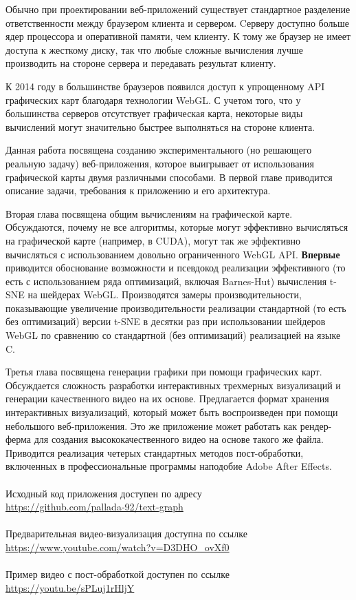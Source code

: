 Обычно при проектировании веб-приложений существует стандартное разделение ответственности между браузером клиента и сервером. Cерверу доступно больше ядер процессора и оперативной памяти, чем клиенту. К тому же браузер не имеет доступа к жесткому диску, так что любые сложные вычисления лучше производить на стороне сервера и передавать результат клиенту.

К 2014 году в большинстве браузеров появился доступ к упрощенному API графических карт благодаря технологии WebGL. С учетом того, что у большинства серверов отсутствует графическая карта, некоторые виды вычислений могут значительно быстрее выполняться на стороне клиента.

Данная работа посвящена созданию экспериментального (но решающего реальную задачу) веб-приложения, которое выигрывает от использования графической карты двумя различными способами. В первой главе приводится описание задачи, требования к приложению и его архитектура.

Вторая глава посвящена общим вычислениям на графической карте. Обсуждаются, почему не все алгоритмы, которые могут эффективно вычисляться на графической карте (например, в CUDA), могут так же эффективно вычисляться с использованием довольно ограниченного WebGL API. {\bfseries Впервые} приводится обоснование возможности и псевдокод реализации эффективного (то есть с использованием ряда оптимизаций, включая Barnes-Hut) вычисления t-SNE на шейдерах WebGL. Производятся замеры производительности, показывающие увеличение производительности реализации стандартной (то есть без оптимизаций) версии t-SNE в десятки раз при использовании шейдеров WebGL по сравнению со стандартной (без оптимизаций) реализацией на языке C.

Третья глава посвящена генерации графики при помощи графических карт. Обсуждается сложность разработки интерактивных трехмерных визуализаций и генерации качественного видео на их основе. Предлагается формат хранения интерактивных визуализаций, который может быть воспроизведен при помощи небольшого веб-приложения. Это же приложение может работать как рендер-ферма для создания высококачественного видео на основе такого же файла. Приводится реализация четерых стандартных методов пост-обработки, включенных в профессиональные программы наподобие Adobe After Effects.
\\
\\
Исходный код приложения доступен по адресу\\
\url{https://github.com/pallada-92/text-graph}\\
\\
Предварительная видео-визуализация доступна по ссылке\\
\url{https://www.youtube.com/watch?v=D3DHO_ovXf0}\\
\\
Пример видео с пост-обработкой доступен по ссылке\\
\url{https://youtu.be/sPLuj1rHljY}\\

